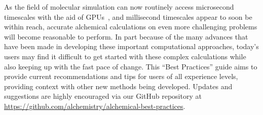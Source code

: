 \documentclass[9pt,bestpractices]{livecoms}
\begin{document}
As the field of molecular simulation can now routinely access microsecond timescales with the aid of GPUs~\cite{salomon-ferrer2013routine}, and millisecond timescales appear to soon be within reach, accurate alchemical calculations on even more challenging problems will become reasonable to perform. 
In part because of the many advances that have been made in developing these important computational approaches, today's users may find it difficult to get started with these complex calculations while also keeping up with the fast pace of change. 
This ``Best Practices'' guide aims to provide current recommendations and tips for users of all experience levels, providing context with other new methods being developed. Updates and suggestions are highly encouraged via our GitHub repository at \url{https://github.com/alchemistry/alchemical-best-practices}.    
\end{document}
